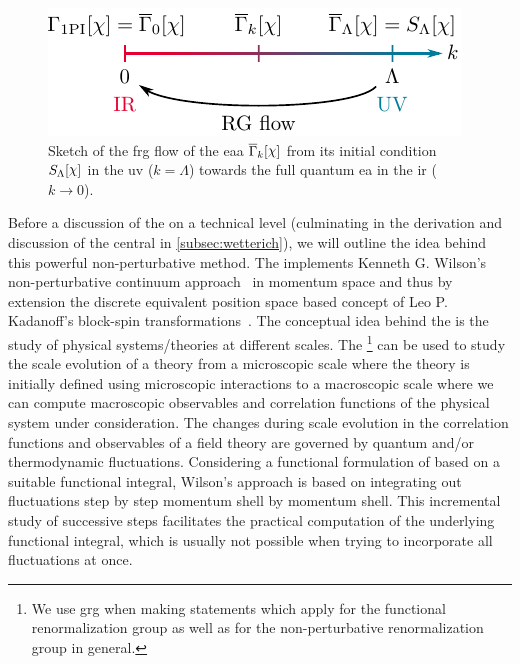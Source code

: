 \begin{figure}[!t]
\begin{center}%
	\vspace{-0.5em}\includegraphics{frg/figures/frg_flow.pdf}%
\end{center}%
	\caption{%
		Sketch of the \acrshort{frg} flow of the \acrshort{eaa} $\FSeaa_k[\FSsf]$ from its initial condition $S_\Lambda[\FSsf]$ in the \acrshort{uv} ($k=\Lambda$) towards the full quantum \acrshort{ea} in the \acrshort{ir} ($k\rightarrow 0$).%
	}%
	\label{fig:rg_scetch}%
\end{figure}%
Before a discussion of the \frg{} on a technical level (culminating in the derivation and discussion of the central \frgEquation{} in \cref{subsec:wetterich}), we will outline the idea behind this powerful non-perturbative method.
The \frg{} implements Kenneth G. Wilson's non-perturbative continuum \rg{} approach~\cite{Wilson:1971bg,Wilson:1971dh,Wilson:1979qg} in momentum space and thus by extension the discrete equivalent \dash{} position space based \dash{} \rg{} concept of Leo P. Kadanoff's block-spin transformations~\cite{Kadanoff:1966wm}.
The conceptual idea behind the \rg{} is the study of physical systems/theories at different scales.
The \grg \footnote{%
	We use \acrshort{grg} when making statements which apply for the functional renormalization group as well as for the non-perturbative renormalization group in general.%
} can be used to study the scale evolution of a theory from a microscopic scale \dash{} where the theory is initially defined using microscopic interactions \dash{} to a macroscopic scale \dash{} where we can compute macroscopic observables and correlation functions of the physical system under consideration.
The changes during scale evolution in the correlation functions and observables of a field theory are governed by quantum and/or thermodynamic fluctuations.
Considering a functional formulation of \qft{} based on a suitable functional integral, Wilson's \rg{} approach is based on integrating out fluctuations step by step \dash{} momentum shell by momentum shell.
This incremental study of successive \rg{} steps facilitates the practical computation of the underlying functional integral, which is usually not possible when trying to incorporate all fluctuations at once.

